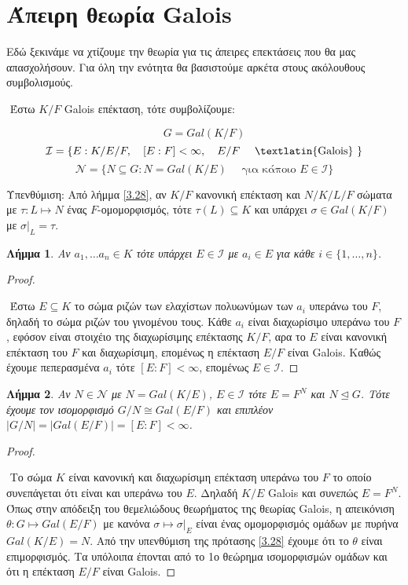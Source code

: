 \documentclass[oneside,a4paper]{article}
\newtheorem{lemma}{Λήμμα}
\newcommand {\tl}{\textlatin}
\begin{document}
\pagebreak
\section{Άπειρη θεωρία \tl{Galois}}
\vspace{1cm}

Εδώ ξεκινάμε να χτίζουμε την θεωρία για τις άπειρες επεκτάσεις που θα μας απασχολήσουν. Για όλη την ενότητα θα βασιστούμε αρκέτα στους ακόλουθους συμβολισμούς.

$ $\newline
\noindent Έστω $K/F$ \tl{Galois} επέκταση, τότε συμβολίζουμε:

$$G=Gal(K/F)$$
$$\mathcal{I} = \{ E: K/E/F , \quad [E:F]<\infty , \quad E/F \quad\text{ \tl{Galois} } \}$$
$$\mathcal{N} = \{N \subseteq G: N = Gal(K/E) \quad\text{ για κάποιo } E \in \mathcal{I} \}$$

Υπενθύμιση: Από λήμμα \ref{3.28}, αν $K/F$ κανονική επέκταση και $N/K/L/F$ σώματα με $\tau :L \mapsto N$ ένας $F$-ομομορφισμός, τότε $\tau(L) \subseteq K$ και υπάρχει $\sigma \in Gal(K/F)$ με $\sigma|_L = \tau$.


\begin{lemma} \label{17.1} Aν $a_1 , \ldots a_n \in K$ τότε υπάρχει $E \in \mathcal{I}$ με $a_i \in E$ για κάθε $i \in \{1,\dots, n\}$.
\end{lemma}
\begin{proof} $ $%


$ $\newline
Έστω $E\subseteq K$ το σώμα ριζών των ελαχίστων πολυωνύμων των $a_i$ υπεράνω του $F$, δηλαδή το σώμα ριζών του γινομένου τους. Kάθε $a_i$ είναι διαχωρίσιμο υπεράνω του $F$, εφόσον είναι στοιχέιο της διαχωρίσιμης επέκτασης $K/F$, αρα το $E$ είναι κανονική επέκταση του $F$ και διαχωρίσιμη, επομένως η επέκταση $E/F$ είναι \tl{Galois}. Καθώς έχουμε πεπερασμένα $a_i$ τότε $[E:F]< \infty$, επομένως $E \in \mathcal{I}$.

\end{proof}

\begin{lemma} \label{17.2} Αν $N \in \mathcal{N}$ με $N = Gal(K/E)$, $E \in \mathcal{I}$ τότε $E=F^N$ και $N\unlhd G$. Τότε έχουμε τον ισομορφισμό $G/N \cong Gal(E/F)$ και επιπλέον $|G/N| = |Gal(E/F)| = [E:F] < \infty$.
\end{lemma}  
\begin{proof} $ $
 
$ $\newline
Το σώμα $K$ είναι κανονική και διαχωρίσιμη επέκταση υπεράνω του $F$ το οποίο συνεπάγεται ότι είναι και υπεράνω του $E$. Δηλαδή $K/E$ \tl{Galois} και συνεπώς $E = F^N$. Όπως στην απόδειξη του θεμελιώδους θεωρήματος της θεωρίας \tl{Galois}, η απεικόνιση $\theta : G \mapsto Gal(E/F)$ με κανόνα $\sigma \mapsto \sigma|_E$ είναι ένας ομομορφισμός ομάδων με πυρήνα $Gal(K/E) = N$. Από την υπενθύμιση της πρότασης \ref{3.28} έχουμε ότι το $\theta$ είναι επιμορφισμός. Τα υπόλοιπα έπονται από το 1ο θεώρημα ισομορφισμών ομάδων και ότι η επέκταση $E/F$ είναι \tl{Galois}.
\end{proof}
\end{document}
